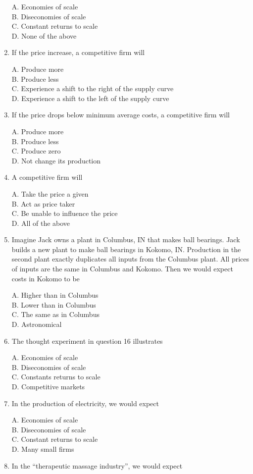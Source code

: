 \documentclass[
]{book}
\begin{document}
\begin{enumerate}
  A. Economies of scale\\
  B. Diseconomies of scale\\
  C. Constant returns to scale\\
  D. None of the above
\item
  If the price increase, a competitive firm will

  A. Produce more\\
  B. Produce less\\
  C. Experience a shift to the right of the supply curve\\
  D. Experience a shift to the left of the supply curve
\item
  If the price drops below minimum average costs, a competitive firm will

  A. Produce more\\
  B. Produce less\\
  C. Produce zero\\
  D. Not change its production
\item
  A competitive firm will

  A. Take the price a given\\
  B. Act as price taker\\
  C. Be unable to influence the price\\
  D. All of the above
\item
  Imagine Jack owns a plant in Columbus, IN that makes ball bearings. Jack builds a new plant to make ball bearings in Kokomo, IN. Production in the second plant exactly duplicates all inputs from the Columbus plant. All prices of inputs are the same in Columbus and Kokomo. Then we would expect costs in Kokomo to be

  A. Higher than in Columbus\\
  B. Lower than in Columbus\\
  C. The same as in Columbus\\
  D. Astronomical
\item
  The thought experiment in question 16 illustrates

  A. Economies of scale\\
  B. Diseconomies of scale\\
  C. Constants returns to scale\\
  D. Competitive markets
\item
  In the production of electricity, we would expect

  A. Economies of scale\\
  B. Diseconomies of scale\\
  C. Constant returns to scale\\
  D. Many small firms
\item
  In the ``therapeutic massage industry'', we would expect


\end{enumerate}
\end{document}
